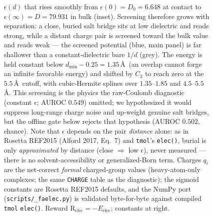\documentclass[11pt]{article}
\newcommand{\R}{\mathrm{R}}
\newcommand{\ttk}[1]{\texttt{\small #1}}
\begin{document}
\begin{figure}[htbp]
{$\epsilon(d)$ that rises smoothly from $\epsilon(0)=D_0=6.648$ at contact to $\epsilon(\infty)=D=79.931$
in bulk (inset). Screening therefore grows with separation: a close, buried salt bridge sits at low
dielectric and reads strong, while a distant charge pair is screened toward the bulk value and reads
weak --- the screened potential (blue, main panel) is far shallower than a constant-dielectric bare
$1/d$ (grey). The energy is held constant below $d_{\min}{-}0.25=1.35$\,\AA\ (an overlap cannot forge
an infinite favorable energy) and shifted by $C_2$ to reach zero at the $5.5$\,\AA\ cutoff, with
cubic-Hermite splines over $1.35$--$1.85$ and $4.5$--$5.5$\,\AA. This screening is the physics the
raw-Coulomb diagnostic (constant $\epsilon$; AUROC $0.549$) omitted; we hypothesized it would suppress
long-range charge noise and up-weight genuine salt bridges, but the offline gate below rejects that
hypothesis (AUROC $0.502$, chance). Note that $\epsilon$ depends on the pair \emph{distance} alone: as
in Rosetta REF2015 (Alford 2017, Eq.\ 7) and \ttk{tmol}'s \ttk{elec()}, burial is only \emph{approximated}
by distance (close $\Rightarrow$ low $\epsilon$), never measured --- there is no solvent-accessibility
or generalized-Born term. Charges $q_i$ are the net-correct \emph{formal} charged-group values
(heavy-atom-only complexes; the same \ttk{CHARGE} table as the diagnostic); the sigmoid constants are
Rosetta REF2015 defaults, and the NumPy port (\ttk{scripts/\_faelec.py}) is validated byte-for-byte
against compiled \ttk{tmol} \ttk{elec()}. Reward $\R_{\mathrm{elec}}=-E_{\mathrm{elec}}$; constants at
right.}
\label{fig:faelec}
\end{figure}
\end{document}
